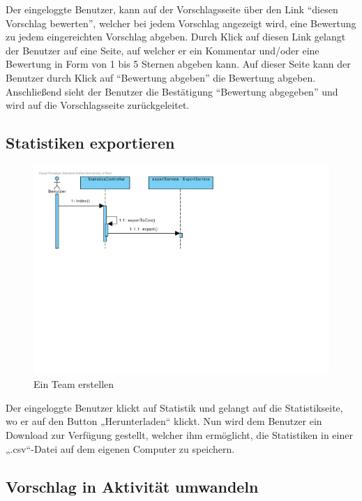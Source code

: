Der eingeloggte Benutzer, kann auf der Vorschlagsseite über den Link
``diesen Vorschlag bewerten'', welcher bei jedem Vorschlag angezeigt
wird, eine Bewertung zu jedem eingereichten Vorschlag abgeben. Durch
Klick auf diesen Link gelangt der Benutzer auf eine Seite, auf welcher
er ein Kommentar und/oder eine Bewertung in Form von 1 bis 5 Sternen
abgeben kann. Auf dieser Seite kann der Benutzer durch Klick auf
 ``Bewertung abgeben'' die Bewertung abgeben. Anschließend sieht
 der Benutzer die Bestätigung ``Bewertung abgegeben'' und wird auf die Vorschlagsseite zurückgeleitet.
 

\subsection{Statistiken exportieren}

\begin{figure}[H]
  \centering
  \includegraphics[width=\textwidth, clip]{gfx/statistiken_exportieren}
  \caption{Ein Team erstellen}
\end{figure}

Der eingeloggte Benutzer klickt auf Statistik und gelangt auf die
Statistikseite, wo er auf den Button „Herunterladen“ klickt. Nun wird
dem Benutzer ein Download zur Verfügung gestellt, welcher ihm
ermöglicht, die Statistiken in einer „.csv“-Datei auf dem eigenen
Computer zu speichern.

\subsection{Vorschlag in Aktivität umwandeln}

